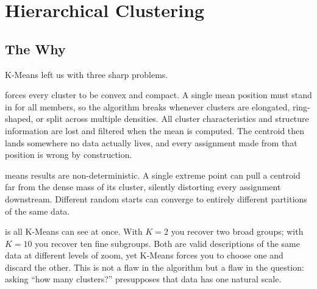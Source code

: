 
\chapter{Hierarchical Clustering}


\section{The Why}



K-Means left us with three sharp problems.

 forces every cluster to be convex and compact.
A single mean position must stand in for all members, so the algorithm breaks whenever 
clusters are elongated, ring-shaped, or split across multiple densities. All cluster characteristics 
and structure information are lost and filtered when the mean is computed.
The centroid then lands somewhere no data actually lives, and every assignment made 
from that position is wrong by construction.

 means results are non-deterministic.
A single extreme point can pull a centroid far from the dense mass of its cluster, silently distorting every assignment downstream.
Different random starts can converge to entirely different partitions of the same data.

 is all K-Means can see at once.
With $K{=}2$ you recover two broad groups; with $K{=}10$ you recover ten fine subgroups.
Both are valid descriptions of the same data at different levels of zoom, yet K-Means forces you to choose one and discard the other.
This is not a flaw in the algorithm but a flaw in the question: asking ``how many clusters?'' presupposes that data has one natural scale.

